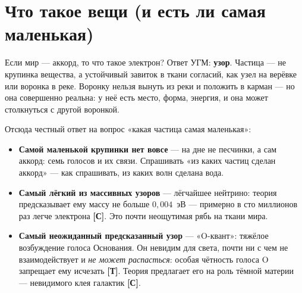 \documentclass[11pt,letterpaper]{article}
\newcommand{\stT}{\textbf{[Т]}\xspace}
\newcommand{\stC}{\textbf{[С]}\xspace}
\begin{document}
\section{Что такое вещи (и есть ли самая маленькая)}
\label{sec:things}

Если мир --- аккорд, то что такое электрон? Ответ УГМ: \textbf{узор}.
Частица --- не крупинка вещества, а устойчивый завиток в ткани
согласий, как узел на верёвке или воронка в реке. Воронку нельзя
вынуть из реки и положить в карман --- но она совершенно реальна:
у неё есть место, форма, энергия, и она может столкнуться с другой
воронкой.

Отсюда честный ответ на вопрос «какая частица самая маленькая»:

\begin{itemize}[leftmargin=1.6em]
  \item \textbf{Самой маленькой крупинки нет вовсе} --- на дне не
        песчинки, а сам аккорд: семь голосов и их связи. Спрашивать
        «из каких частиц сделан аккорд» --- как спрашивать, из каких
        волн сделана вода.
  \item \textbf{Самый лёгкий из массивных узоров} --- лёгчайшее нейтрино:
        теория предсказывает ему массу не больше $0{,}004$~эВ ---
        примерно в сто миллионов раз легче электрона \stC. Это почти
        неощутимая рябь на ткани мира.
  \item \textbf{Самый неожиданный предсказанный узор} --- «O-квант»:
        тяжёлое возбуждение голоса Основания. Он невидим для света,
        почти ни с чем не взаимодействует и \emph{не может распасться}:
        особая чётность голоса O запрещает ему исчезать \stT. Теория
        предлагает его на роль тёмной материи --- невидимого клея
        галактик \stC.
\end{itemize}
\end{document}
